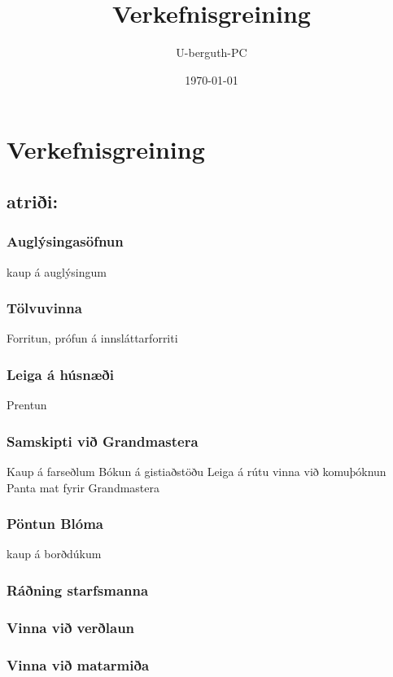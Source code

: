 \documentclass[11pt]{article}
\title{Verkefnisgreining}
\author{U-berguth-PC\berguth}
\date{\today}
\begin{document}
\maketitle

\setcounter{tocdepth}{3}
\tableofcontents
\vspace*{1cm}
\section{Verkefnisgreining}
\label{sec-1}
\subsection{atriði:}
\label{sec-1-1}
\subsubsection{Auglýsingasöfnun}
\label{sec-1-1-1}

kaup á auglýsingum
\subsubsection{Tölvuvinna}
\label{sec-1-1-2}

Forritun, prófun á innsláttarforriti
\subsubsection{Leiga á húsnæði}
\label{sec-1-1-3}

Prentun
\subsubsection{Samskipti við Grandmastera}
\label{sec-1-1-4}

Kaup á farseðlum
Bókun á gistiaðstöðu
Leiga á rútu
vinna við komuþóknun
Panta mat fyrir Grandmastera
\subsubsection{Pöntun Blóma}
\label{sec-1-1-5}

kaup á borðdúkum
\subsubsection{Ráðning starfsmanna}
\label{sec-1-1-6}
\subsubsection{Vinna við verðlaun}
\label{sec-1-1-7}
\subsubsection{Vinna við matarmiða}
\label{sec-1-1-8}
\end{document}
